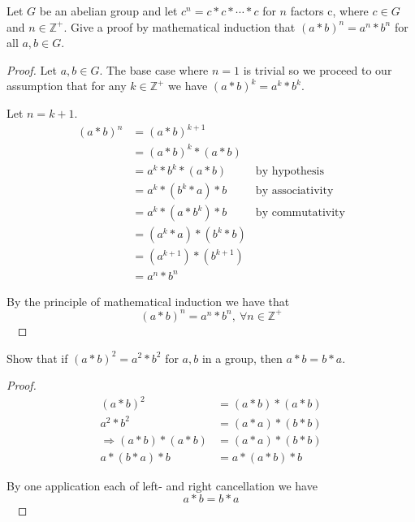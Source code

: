 \begin{prob}[33, p.49]
    Let $G$ be an abelian group and let $c^n = c * c * \cdots * c$ 
    for $n$ factors c, where $c \in G$ and $n \in \mathbb Z^+$. 
    Give a proof by mathematical induction that $(a*b)^n = a^n * b^n$ 
    for all $a,b \in G$. 
\end{prob}
\begin{proof}
    Let $a,b \in G$. The base case where $n = 1$ is trivial so 
    we proceed to our assumption that for any $k \in \mathbb Z^+$ we 
    have $(a*b)^k = a^k * b^k$. 

    Let $n = k + 1$. 
    \begin{align*}
        (a*b)^n &= (a*b)^{k+1} \\ 
                &= (a*b)^k * (a*b) \\  
                &= a^k * b^k * (a*b) & \text{by hypothesis} \\ 
                &= a^k * (b^k * a) * b & \text{by associativity} \\ 
                &= a^k * (a * b^k) * b & \text{by commutativity} \\ 
                &= (a^k * a) * (b^k * b) \\ 
                &= (a^{k+1}) * (b^{k+1}) \\ 
                &= a^n * b^n
    \end{align*}
     
    By the principle of mathematical induction we have that 
    $$  
        (a*b)^n = a^n * b^n, \: \forall n \in \mathbb Z^+
    $$ 
\end{proof}

\newpage 
\begin{prob}[35, p. 49]
    Show that if $(a*b)^2 = a^2 * b^2$ for $a,b$ in a group, then 
    $a*b = b*a$.  
\end{prob}
\begin{proof}
    \begin{align*}
        (a*b)^2 &= (a*b)*(a*b) \\ 
        a^2 * b^2 &= (a*a) * (b*b) \\ 
        \Rightarrow (a*b) * (a*b) &= (a*a) * (b*b) \\ 
                    a * (b*a) * b &= a*(a*b)*b
    \end{align*}
    
    By one application each of left- and right cancellation we have 
    $$ 
        a*b = b*a
    $$ 
\end{proof}

